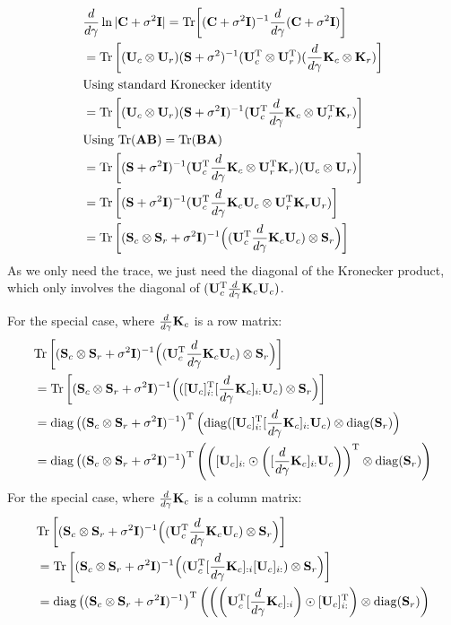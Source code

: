 \documentclass{article}
\newcommand{\B}[1]{{\bf{#1}}}
\begin{document}
\begin{align}&
\dg \ln | \B{C} + \sigma^2\B{I} |  = \Tr{\left[ (\B{C} +
  \sigma^2\B{I})^{-1} \dg (\B{C} + \sigma^2 \B{I})\right]} \\&
  = \Tr \left [ (\B{U}_c \otimes \B{U}_r) (\B{S} +
  \sigma^2)^{-1} (\B{U}_c^{\T} \otimes \B{U}_r^{\T})  (\dg \B{K}_c \otimes
  \B{K}_r)\right ] \\&
  \text{Using standard Kronecker identity}\\&
  = \Tr \left [ (\B{U}_c \otimes \B{U}_r) (\B{S} +
  \sigma^2\B{I})^{-1} (\B{U}_c^{\T} \dg \B{K}_c \otimes \B{U}_r^{\T} \B{K}_r) \right ]\\&
  \text{Using $\Tr(\B{A}\B{B}) = \Tr(\B{B}\B{A})$}\\&
  = \Tr \left [ (\B{S} + \sigma^2\B{I})^{-1} (\B{U}_c^{\T} \dg \B{K}_c \otimes \B{U}_r^{\T} \B{K}_r)  (\B{U}_c \otimes \B{U}_r) \right ] \\& 
   =  \Tr \left [ (\B{S} + \sigma^2\B{I})^{-1} (\B{U}_c^{\T} \dg \B{K}_c  \B{U}_c \otimes \B{U}_r^{\T} \B{K}_r \B{U}_r) \right ] \\&
   =  \Tr \left [ (\B{S}_c \otimes \B{S}_r + \sigma^2\B{I})^{-1} \Big((
   \B{U}_c^{\T} \dg \B{K}_c  \B{U}_c) \otimes \B{S}_r\Big) \right ]
\end{align}
As we only need the trace, we just need the diagonal of the Kronecker
product, which only involves the diagonal of $(
   \B{U}_c^{\T} \dg \B{K}_c  \B{U}_c)$.

For the special case, where $\dg \B{K}_c$ is a row matrix:
\begin{align}&
  \Tr \left [ (\B{S}_c \otimes \B{S}_r + \sigma^2\B{I})^{-1} \Big((
   \B{U}_c^{\T} \dg \B{K}_c  \B{U}_c) \otimes \B{S}_r\Big) \right ]
\\&
=   \Tr \left [ (\B{S}_c \otimes \B{S}_r + \sigma^2\B{I})^{-1} \Big((
   [\B{U}_c]_{i:}^{\T} [\dg \B{K}_c]_{i:}  \B{U}_c) \otimes \B{S}_r\Big) \right ]
\\&
=   \diag\left((\B{S}_c \otimes \B{S}_r + \sigma^2\B{I})^{-1}\right)^{\T} \Big(\diag(
   [\B{U}_c]_{i:}^{\T} [\dg \B{K}_c]_{i:}  \B{U}_c) \otimes
   \diag(\B{S}_r)\Big) 
\\&
=   \diag\left((\B{S}_c \otimes \B{S}_r + \sigma^2\B{I})^{-1}\right)^{\T} \left(
   \left([\B{U}_c]_{i:} \odot\left([\dg \B{K}_c]_{i:}  \B{U}_c\right) \right) ^{\T} \otimes \diag(\B{S}_r)\right) 
\end{align}
For the special case, where $\dg \B{K}_c$ is a column matrix:
\begin{align}&
  \Tr \left [ (\B{S}_c \otimes \B{S}_r + \sigma^2\B{I})^{-1} \Big((
   \B{U}_c^{\T} \dg \B{K}_c  \B{U}_c) \otimes \B{S}_r\Big) \right ]
\\&
=   \Tr \left [ (\B{S}_c \otimes \B{S}_r + \sigma^2\B{I})^{-1} \Big((
   \B{U}_c^{\T} [\dg \B{K}_c]_{:i}  [\B{U}_c]_{i:}) \otimes \B{S}_r\Big) \right ]
\\&
=   \diag\left((\B{S}_c \otimes \B{S}_r + \sigma^2\B{I})^{-1}\right)^{\T} \left(\left(
   \left(\B{U}_c^{\T} [\dg \B{K}_c]_{:i} \right) \odot [\B{U}_c]_{i:}^{\T}\right) \otimes \diag(\B{S}_r)\right) 
\end{align}
\end{document}
